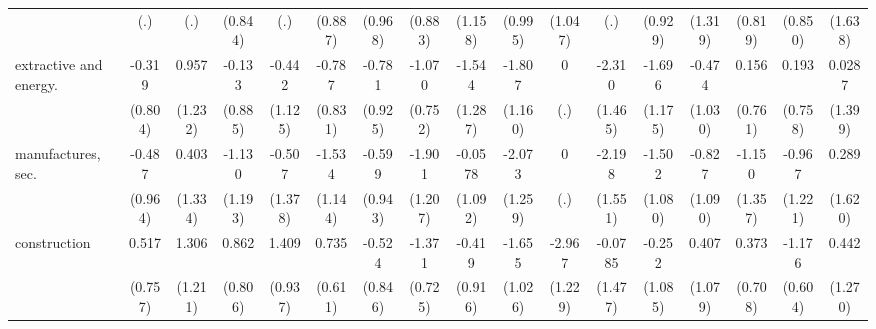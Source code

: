 {\begin{tabular}{l*{16}{c}}
                    &         (.)         &         (.)         &     (0.844)         &         (.)         &     (0.887)         &     (0.968)         &     (0.883)         &     (1.158)         &     (0.995)         &     (1.047)         &         (.)         &     (0.929)         &     (1.319)         &     (0.819)         &     (0.850)         &     (1.638)         \\
[1em]
extractive and energy.&      -0.319         &       0.957         &      -0.133         &      -0.442         &      -0.787         &      -0.781         &      -1.070         &      -1.544         &      -1.807         &           0         &      -2.310         &      -1.696         &      -0.474         &       0.156         &       0.193         &      0.0287         \\
                    &     (0.804)         &     (1.232)         &     (0.885)         &     (1.125)         &     (0.831)         &     (0.925)         &     (0.752)         &     (1.287)         &     (1.160)         &         (.)         &     (1.465)         &     (1.175)         &     (1.030)         &     (0.761)         &     (0.758)         &     (1.399)         \\
[1em]
manufactures, sec.  &      -0.487         &       0.403         &      -1.130         &      -0.507         &      -1.534         &      -0.599         &      -1.901         &     -0.0578         &      -2.073         &           0         &      -2.198         &      -1.502         &      -0.827         &      -1.150         &      -0.967         &       0.289         \\
                    &     (0.964)         &     (1.334)         &     (1.193)         &     (1.378)         &     (1.144)         &     (0.943)         &     (1.207)         &     (1.092)         &     (1.259)         &         (.)         &     (1.551)         &     (1.080)         &     (1.090)         &     (1.357)         &     (1.221)         &     (1.620)         \\
[1em]
construction        &       0.517         &       1.306         &       0.862         &       1.409         &       0.735         &      -0.524         &      -1.371         &      -0.419         &      -1.655         &      -2.967\sym{*}  &     -0.0785         &      -0.252         &       0.407         &       0.373         &      -1.176         &       0.442         \\
                    &     (0.757)         &     (1.211)         &     (0.806)         &     (0.937)         &     (0.611)         &     (0.846)         &     (0.725)         &     (0.916)         &     (1.026)         &     (1.229)         &     (1.477)         &     (1.085)         &     (1.079)         &     (0.708)         &     (0.604)         &     (1.270)         \\

\end{tabular}}
